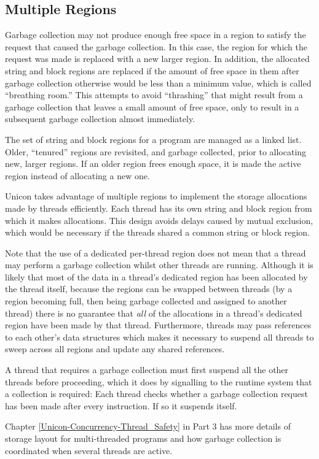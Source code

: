 \subsection{Multiple Regions}

Garbage collection may not produce enough free space in a region to
satisfy the request that caused the garbage collection. In this case,
the region for which the request was made is replaced with a new
larger region. In addition, the allocated string and block regions are
replaced if the amount of free space in them after garbage collection
otherwise would be less than a minimum value, which is called
``breathing room.'' This attempts to avoid ``thrashing'' that might
result from a garbage collection that leaves a small amount of free
space, only to result in a subsequent garbage collection almost
immediately.

The set of string and block regions for a program are managed as a
linked list. Older, ``tenured'' regions are revisited, and garbage
collected, prior to allocating new, larger regions. If an older region
frees enough space, it is made the active region instead of allocating
a new one.

\label{Multiple-Regions}
{\color{blue}
Unicon takes advantage of multiple regions to implement the storage
allocations made by threads efficiently.  Each thread has its own
string and block region from which it makes allocations. This design
avoids delays caused by mutual exclusion, which would be necessary if
the threads shared a common string or block region.

Note that the use of a dedicated per-thread region does not mean that
a thread may perform a garbage collection whilst other threads are
running. Although it is likely that most of the data in a thread's
dedicated region has been allocated by the thread itself, because the
regions can be swapped between threads (by a region becoming full,
then being garbage collected and assigned to another thread) there is
no guarantee that {\em all} of the allocations in a thread's dedicated
region have been made by that thread. Furthermore, threads may pass references
to each other's data structures which makes it necessary to suspend all
threads to sweep across all regions and update any shared references.

A thread that requires a garbage collection must first suspend all the
other threads before proceeding, which it does by signalling to the
runtime system that a collection is required: Each thread checks
whether a garbage collection request has been made after every
instruction. If so it suspends itself.

Chapter \ref{Unicon-Concurrency-Thread_Safety} in Part 3 has more
details of storage layout for multi-threaded programs and how garbage
collection is coordinated when several threads are active.  }

